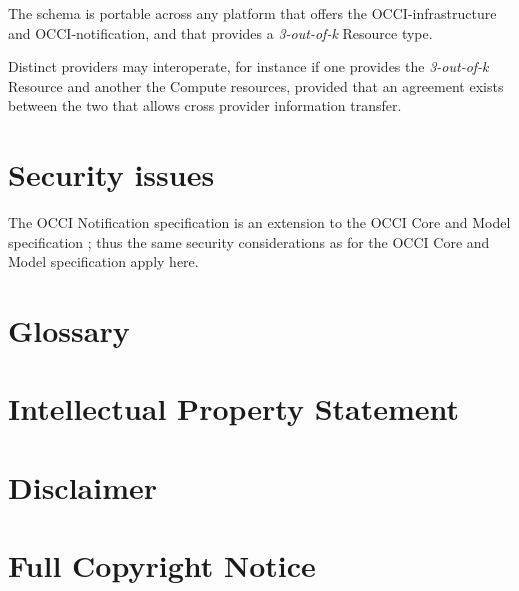 \documentclass[10pt,a4paper]{article}
\begin{document}
The schema is portable across any platform that offers the OCCI-infrastructure and OCCI-notification, and that provides a  {\em 3-out-of-k} Resource type.

Distinct providers may interoperate, for instance if one provides the  {\em 3-out-of-k} Resource and another the Compute resources, provided that an agreement exists between the two that allows cross provider information transfer.

\section{Security issues}
The OCCI Notification specification is an extension to the OCCI Core
and Model specification \cite{occi:core}; thus the same security
considerations as for the OCCI Core and Model specification apply
here.

\section{Glossary}
\label{sec:glossary}

 
%

\section{Intellectual Property Statement}


\section{Disclaimer}


\section{Full Copyright Notice}




\end{document}

